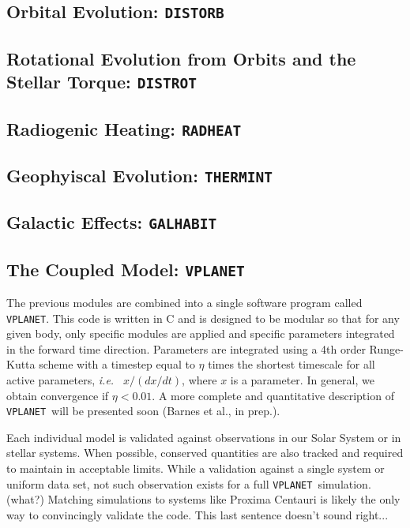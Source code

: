 \documentclass[preprint,12pt]{aastex}
\newcommand{\xxx}[1]{{\color{red} #1}} %
\def\ie{{\it i.e.\ }}
\def\vplanet{\texttt{\footnotesize{VPLANET}}\xspace}
\def\distorb{\texttt{\footnotesize{DISTORB}}\xspace}
\def\distrot{\texttt{\footnotesize{DISTROT}}\xspace}
\def\radheat{\texttt{\footnotesize{RADHEAT}}\xspace}
\def\thermint{\texttt{\footnotesize{THERMINT}}\xspace}
\def\galhabit{\texttt{\footnotesize{GALHABIT}}\xspace}
\begin{document}
\subsection{Orbital Evolution: \distorb}
\label{sec:models:distorb}

\subsection{Rotational Evolution from Orbits and the Stellar Torque: \distrot}
\label{sec:models:distrot}

\subsection{Radiogenic Heating: \radheat}
\label{sec:models:radheat}

\subsection{Geophyiscal Evolution: \thermint}
\label{sec:models:thermint}

\subsection{Galactic Effects: \galhabit}
\label{sec:models:galhabit}

\subsection{The Coupled Model: \vplanet}
\label{sec:models:vplanet}
The previous modules are combined into a single software program
called \vplanet. This code is written in C and is designed to be
modular so that for any given body, only specific modules are applied
and specific parameters integrated in the forward time direction. 
Parameters are integrated
using a 4th order Runge-Kutta scheme with a timestep equal to $\eta$
times the shortest timescale for all active parameters, \ie
$x/(dx/dt)$, where $x$ is a parameter. In general, we obtain convergence if
$\eta < 0.01$. A more complete and quantitative description of
\vplanet~will be presented soon (Barnes et al., in prep.). 

Each individual model is validated against observations in our Solar
System or in stellar systems. When possible, conserved quantities are
also tracked and \xxx{required to maintain in acceptable limits}. \xxx{While a
validation against a single system or uniform data set, not such
observation exists for a full \vplanet~simulation. (what?)} Matching
simulations to systems like Proxima Centauri is likely the only way to
convincingly validate the code. \xxx{This last sentence doesn't sound right...}
\end{document}
